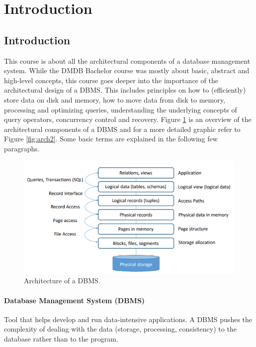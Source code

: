 \section{Introduction}

\subsection{Introduction}

This course is about all the architectural components of a database management system. While the DMDB Bachelor course was mostly about basic, abstract and high-level concepts, this course goes deeper into the importance of the architectural design of a DBMS. This includes principles on how to (efficiently) store data on disk and memory, how to move data from disk to memory, processing and optimizing queries, understanding the underlying concepts of query operators, concurrency control and recovery. Figure \ref{fig:arch} is an overview of the architectural components of a DBMS and for a more detailed graphic refer to Figure \ref{fig:arch2}. Some basic terms are explained in the following few paragraphs.

\begin{figure}[h]
	\centering
	\includegraphics[scale=0.8]{images/00-arch.PNG}
	\caption{Architecture of a DBMS.}
	\label{fig:arch}
\end{figure}

\paragraph{Database Management System (DBMS)}
Tool that helps develop and run data-intensive applications. A DBMS pushes the complexity of dealing with the data (storage, processing, consistency) to the database rather than to the program.

